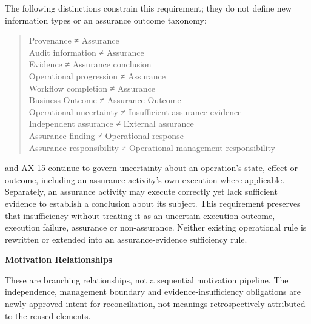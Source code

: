 The following distinctions constrain this requirement; they do not define new information types or an assurance outcome taxonomy:



\begin{quote}\small\ttfamily
Provenance ≠ Assurance\\
Audit information ≠ Assurance\\
Evidence ≠ Assurance conclusion\\
Operational progression ≠ Assurance\\
Workflow completion ≠ Assurance\\
Business Outcome ≠ Assurance Outcome\\
Operational uncertainty ≠ Insufficient assurance evidence\\
Independent assurance ≠ External assurance\\
Assurance finding ≠ Operational response\\
Assurance responsibility ≠ Operational management responsibility\\

\end{quote}


\hyperref[element:fc732b64fc564127b73174e28d9ccce8]{\texttt{}} and \hyperref[element:ef8abbaec37e4890ad78b9f263e67906]{AX-15} continue to govern uncertainty about an operation's state, effect or outcome, including an assurance activity's own execution where applicable. Separately, an assurance activity may execute correctly yet lack sufficient evidence to establish a conclusion about its subject. This requirement preserves that insufficiency without treating it as an uncertain execution outcome, execution failure, assurance or non-assurance. Neither existing operational rule is rewritten or extended into an assurance-evidence sufficiency rule.



\par\medskip\textbf{Motivation Relationships}\par


These are branching relationships, not a sequential motivation pipeline. The independence, management boundary and evidence-insufficiency obligations are newly approved intent for reconciliation, not meanings retrospectively attributed to the reused elements.



